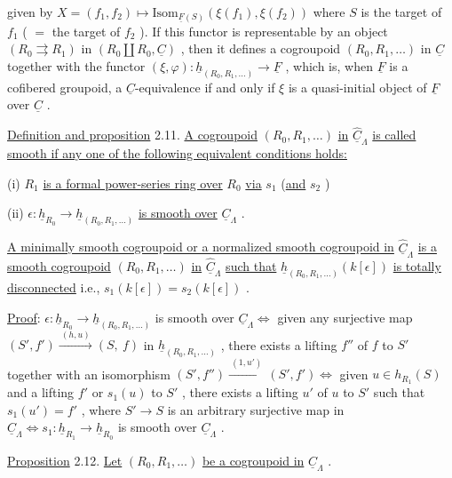  given by  $X = (f_1,f_2) \longmapsto \mathrm{Isom}_{\underline{F}(S)}(\xi(f_1),\xi(f_2))$  where  $S$  is the target of  $f_1$ ( $=$ the target of  $f_2$ ). If this functor is representable by an object  $(R_0 \rightrightarrows R_1)$ in  $(R_0 \amalg R_0, \underline{C})$  , then it defines  a cogroupoid  $(R_0,R_1,\ldots)$  in  $\underline{C}$  together with the functor  $(\xi,\varphi) : \underline{h}_{(R_0,R_1,\ldots)} \to \underline{F}$ , which is, when  $\underline{F}$  is a cofibered groupoid, a  $\underline{C}$-equivalence if and only if  $\xi$  is a quasi-initial object of  $\underline{F}$  over  $\underline{C}$ .


\underline{Definition and proposition} 2.11.  \underline{A cogroupoid}  $(R_0,R_1,\ldots)$  \underline{in}  $\hat{\underline{C}}_\Lambda$  \underline{is called smooth if any one of the following equivalent conditions holds:}

 (i)  $R_1$  \underline{is a formal power-series ring over}  $R_0$  \underline{via} $s_1$  (\underline{and}  $s_2$ )

 (ii)  $\epsilon : \underline{h}_{R_0} \longrightarrow \underline{h}_{(R_0,R_1,\ldots)}$  \underline{is smooth over}  $\underline{C}_\Lambda$ .

\underline{A minimally smooth cogroupoid or a normalized smooth cogroupoid in}  $\hat{\underline{C}}_\Lambda$  \underline{is a smooth cogroupoid}  $(R_0,R_1,\ldots)$  \underline{in}  $\hat{\underline{C}}_\Lambda$  \underline{such that}  $\underline{h}_{(R_0,R_1,\ldots)}(k[\epsilon])$  \underline{is totally disconnected} i.e.,  $s_1(k[\epsilon]) = s_2(k[\epsilon])$  .

\underline{Proof}:  $\epsilon : \underline{h}_{R_0} \to \underline{h}_{(R_0,R_1,\ldots)}$  is smooth over  $\underline{C}_\Lambda \Leftrightarrow$ given any surjective map  $(S',f') \xrightarrow{\ (h,u)\ } (S,\ f)$  in  $\underline{h}_{(R_0,R_1,\ldots)}$  , there exists a lifting  $f''$  of  $f$ to  $S'$  together with an isomorphism  $(S',f'') \xrightarrow{\ (1,u')\ } (S',f') \Leftrightarrow$ given  $u \in h_{R_1}(S)$ and a lifting  $f'$  or  $s_1(u)$  to  $S'$  , there exists a lifting  $u'$  of  $u$  to  $S'$ such that  $s_1(u') = f'$  , where  $S' \to S$  is an arbitrary surjective map in $\underline{C}_\Lambda \Leftrightarrow s_1 : \underline{h}_{R_1} \to \underline{h}_{R_0}$  is smooth over  $\underline{C}_\Lambda$ .


\underline{Proposition} 2.12.  \underline{Let}  $(R_0,R_1,\ldots)$  \underline{be a cogroupoid in}  $\hat{\underline{C}}_\Lambda$ .

